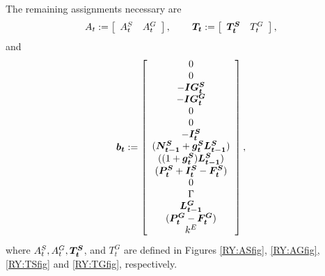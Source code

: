 The remaining assignments necessary are
\begin{equation*}
A_t := \left[
\begin{array}{cc}
A_t^S & A_t^G
\end{array}
\right],
\hspace{0.3in}
\mathbf{\boldsymbol{T_t}} := \left[
\begin{array}{cc}
\mathbf{\boldsymbol{T_t^S}} & T_t^G
\end{array}
\right],
\end{equation*}
and
\begin{equation*}
\rand{b_t} \assign\left[
\begin{array}{c}
0\\
0\\
-\rand{IG^S_t}\\
-\rand{IG^G_t}\\
0\\
0\\
-\rand{I^S_t}\\
(\rand{N^S_{t-1}} + \rand{g^S_t} \rand{L^S_{t-1}})\\
((1+\rand{g^S_t})\rand{L^S_{t-1}})\\
(\rand{P^S_t} + \rand{I^S_t} - \rand{F^S_t})\\
0\\%
\Gamma\\
\rand{L^G_{t-1}}\\
(\rand{P^G_t} - \rand{F^G_t})\\
k^E
\end{array}
\right],
\end{equation*}
where $A_t^S, A_t^G, \mathbf{\boldsymbol{T_t^S}}$, and $T_t^G$ are defined in Figures \ref{RY:ASfig}, \ref{RY:AGfig}, \ref{RY:TSfig} and \ref{RY:TGfig}, respectively.

